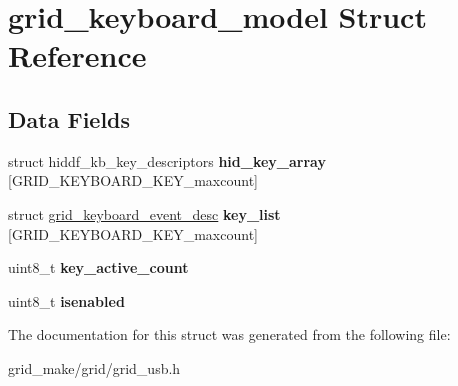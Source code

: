 \hypertarget{structgrid__keyboard__model}{\section{grid\-\_\-keyboard\-\_\-model Struct Reference}
\label{structgrid__keyboard__model}
}
\subsection*{Data Fields}
\begin{DoxyCompactItemize}
\item 
\hypertarget{structgrid__keyboard__model_a665890ea4f5183cc58baa00ee470913c}{struct hiddf\-\_\-kb\-\_\-key\-\_\-descriptors {\bfseries hid\-\_\-key\-\_\-array} \mbox{[}G\-R\-I\-D\-\_\-\-K\-E\-Y\-B\-O\-A\-R\-D\-\_\-\-K\-E\-Y\-\_\-maxcount\mbox{]}}\label{structgrid__keyboard__model_a665890ea4f5183cc58baa00ee470913c}

\item 
\hypertarget{structgrid__keyboard__model_a29bc3a6b736957b6fef9317740b6eff3}{struct \hyperlink{structgrid__keyboard__event__desc}{grid\-\_\-keyboard\-\_\-event\-\_\-desc} {\bfseries key\-\_\-list} \mbox{[}G\-R\-I\-D\-\_\-\-K\-E\-Y\-B\-O\-A\-R\-D\-\_\-\-K\-E\-Y\-\_\-maxcount\mbox{]}}\label{structgrid__keyboard__model_a29bc3a6b736957b6fef9317740b6eff3}

\item 
\hypertarget{structgrid__keyboard__model_a9dc9854922cc503bc135dcafaa185221}{uint8\-\_\-t {\bfseries key\-\_\-active\-\_\-count}}\label{structgrid__keyboard__model_a9dc9854922cc503bc135dcafaa185221}

\item 
\hypertarget{structgrid__keyboard__model_a8b2eceaacf172cd117e47ba08a02fdc4}{uint8\-\_\-t {\bfseries isenabled}}\label{structgrid__keyboard__model_a8b2eceaacf172cd117e47ba08a02fdc4}

\end{DoxyCompactItemize}


The documentation for this struct was generated from the following file\-:\begin{DoxyCompactItemize}
\item 
grid\-\_\-make/grid/grid\-\_\-usb.\-h\end{DoxyCompactItemize}
